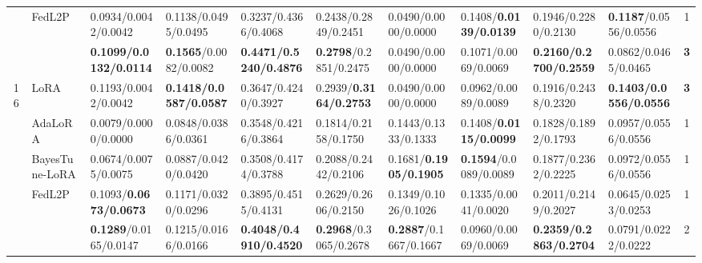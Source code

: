 \begin{table*}[t]
\begin{scriptsize}
{\begin{tabular}{c|l|l|l|l|l|l|l|l|l|c}
                    & FedL2P                               & 0.0934/0.0042/0.0042             & 0.1138/0.0495/0.0495             & 0.3237/0.4366/0.4068             & 0.2438/0.2849/0.2451             & 0.0490/0.0000/0.0000                    & 0.1408/\textbf{0.0139/0.0139}             & 0.1946/0.2280/0.2130               & \textbf{0.1187}/0.0556/0.0556    & 1             \\ %
                    & \method{}                                 & \textbf{0.1099/0.0132/0.0114}    & \textbf{0.1565}/0.0082/0.0082    & \textbf{0.4471/0.5240/0.4876}     & \textbf{0.2798}/0.2851/0.2475    & 0.0490/0.0000/0.0000                    & 0.1071/0.0069/0.0069             & \textbf{0.2160/0.2700/0.2559}       & 0.0862/0.0465/0.0465             & \textbf{3}    \\ \hline
\multirow{5}{*}{16} & LoRA                                   & 0.1193/0.0042/0.0042             & \textbf{0.1418/0.0587/0.0587}    & 0.3647/0.4240/0.3927              & 0.2939/\textbf{0.3164/0.2753}             & 0.0490/0.0000/0.0000                    & 0.0962/0.0089/0.0089             & 0.1916/0.2438/0.2320              & \textbf{0.1403/0.0556/0.0556}    & \textbf{3}    \\ %
                    & AdaLoRA                              & 0.0079/0.0000/0.0000                   & 0.0848/0.0386/0.0361             & 0.3548/0.4216/0.3864             & 0.1814/0.2158/0.1750              & 0.1443/0.1333/0.1333             & 0.1408/\textbf{0.0115/0.0099}             & 0.1828/0.1892/0.1793             & 0.0957/0.0556/0.0556             & 1             \\ %
                    & BayesTune-LoRA                            & 0.0674/0.0075/0.0075             & 0.0887/0.0420/0.0420               & 0.3508/0.4174/0.3788             & 0.2088/0.2442/0.2106             & 0.1681/\textbf{0.1905/0.1905}             & \textbf{0.1594}/0.0089/0.0089    & 0.1877/0.2362/0.2225             & 0.0972/0.0556/0.0556             & 1             \\ %
                    & FedL2P                               & 0.1093/\textbf{0.0673/0.0673}             & 0.1171/0.0320/0.0296              & 0.3895/0.4515/0.4131             & 0.2629/0.2606/0.2150              & 0.1349/0.1026/0.1026             & 0.1335/0.0041/0.0020              & 0.2011/0.2149/0.2027             & 0.0645/0.0253/0.0253             & 1             \\ %
                    & \method{}                                 & \textbf{0.1289}/0.0165/0.0147    & 0.1215/0.0166/0.0166             & \textbf{0.4048/0.4910/0.4520}      & \textbf{0.2968}/0.3065/0.2678    & \textbf{0.2887}/0.1667/0.1667    & 0.0960/0.0069/0.0069              & \textbf{0.2359/0.2863/0.2704}    & 0.0791/0.0222/0.0222             & 2             \\ \bottomrule
\end{tabular}
}
\end{scriptsize}
\vspace{-1.5em}
\end{table*}